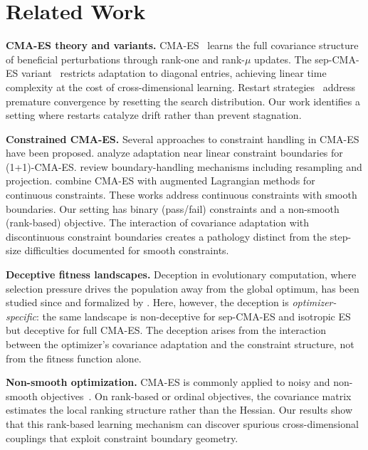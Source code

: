\documentclass[twoside,11pt]{article}
\begin{document}
\section{Related Work}
\label{sec:related}

\textbf{CMA-ES theory and variants.}
CMA-ES~\citep{hansen2001completely} learns the full covariance structure of
beneficial perturbations through rank-one and rank-$\mu$ updates. The
sep-CMA-ES variant~\citep{ros2008simple} restricts adaptation to diagonal
entries, achieving linear time complexity at the cost of cross-dimensional
learning. Restart strategies~\citep{auger2005restart} address premature
convergence by resetting the search distribution. Our work identifies a
setting where restarts catalyze drift rather than prevent stagnation.

\textbf{Constrained CMA-ES.}
Several approaches to constraint handling in CMA-ES have been proposed.
\citet{arnold2012cmaes} analyze adaptation near linear constraint
boundaries for (1+1)-CMA-ES. \citet{kramer2010cmaes} review boundary-handling
mechanisms including resampling and projection. \citet{atamna2016augmented}
combine CMA-ES with augmented Lagrangian methods for continuous constraints.
These works address continuous constraints with smooth boundaries.
Our setting has binary (pass/fail) constraints and a non-smooth (rank-based)
objective. The interaction of covariance adaptation with discontinuous
constraint boundaries creates a pathology distinct from the step-size
difficulties documented for smooth constraints.

\textbf{Deceptive fitness landscapes.}
Deception in evolutionary computation, where selection pressure drives the
population away from the global optimum, has been studied since
\citet{goldberg1987simple} and formalized by \citet{whitley1991fundamental}.
Here, however, the deception is \emph{optimizer-specific}:
the same landscape is non-deceptive for sep-CMA-ES and isotropic ES but
deceptive for full CMA-ES. The deception arises from the interaction between
the optimizer's covariance adaptation and the constraint structure, not from
the fitness function alone.

\textbf{Non-smooth optimization.}
CMA-ES is commonly applied to noisy and non-smooth
objectives~\citep{hansen2009benchmarking}. On rank-based or ordinal objectives,
the covariance matrix estimates the local ranking structure rather than the
Hessian. Our results show that this rank-based learning mechanism can discover
spurious cross-dimensional couplings that exploit constraint boundary
geometry.
\end{document}
